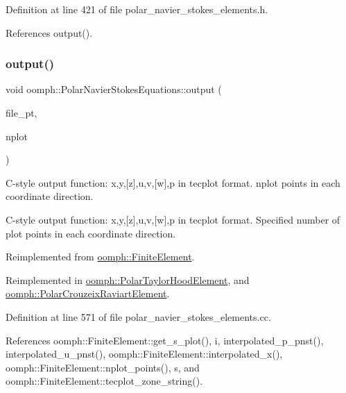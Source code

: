 Definition at line 421 of file polar\+\_\+navier\+\_\+stokes\+\_\+elements.\+h.



References output().

\mbox{\label{classoomph_1_1PolarNavierStokesEquations_a1dd19ac88c126db21ad12bdb06a512f9}} 
\subsubsection{\texorpdfstring{output()}{output()}\hspace{0.1cm}{\footnotesize\ttfamily [4/4]}}
{\footnotesize\ttfamily void oomph\+::\+Polar\+Navier\+Stokes\+Equations\+::output (\begin{DoxyParamCaption}\item[{F\+I\+LE $\ast$}]{file\+\_\+pt,  }\item[{const unsigned \&}]{nplot }\end{DoxyParamCaption})\hspace{0.3cm}{\ttfamily [virtual]}}



C-\/style output function\+: x,y,\mbox{[}z\mbox{]},u,v,\mbox{[}w\mbox{]},p in tecplot format. nplot points in each coordinate direction. 

C-\/style output function\+: x,y,\mbox{[}z\mbox{]},u,v,\mbox{[}w\mbox{]},p in tecplot format. Specified number of plot points in each coordinate direction. 

Reimplemented from \hyperlink{classoomph_1_1FiniteElement_adfaee690bb0608f03320eeb9d110d48c}{oomph\+::\+Finite\+Element}.



Reimplemented in \hyperlink{classoomph_1_1PolarTaylorHoodElement_a491915435066f5545da449fd2ac5e3a7}{oomph\+::\+Polar\+Taylor\+Hood\+Element}, and \hyperlink{classoomph_1_1PolarCrouzeixRaviartElement_a0e5c165c36dacf83709bd8c6fba1be40}{oomph\+::\+Polar\+Crouzeix\+Raviart\+Element}.



Definition at line 571 of file polar\+\_\+navier\+\_\+stokes\+\_\+elements.\+cc.



References oomph\+::\+Finite\+Element\+::get\+\_\+s\+\_\+plot(), i, interpolated\+\_\+p\+\_\+pnst(), interpolated\+\_\+u\+\_\+pnst(), oomph\+::\+Finite\+Element\+::interpolated\+\_\+x(), oomph\+::\+Finite\+Element\+::nplot\+\_\+points(), s, and oomph\+::\+Finite\+Element\+::tecplot\+\_\+zone\+\_\+string().

